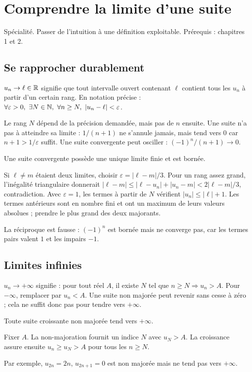 \documentclass[../cours_tle.tex]{subfiles}
\begin{document}
\setcounter{chapter}{8}
\chapter{Comprendre la limite d’une suite}
\label{ch:9}
\begin{objectif}
Spécialité. Passer de l'intuition à une définition exploitable. Prérequis : chapitres 1 et 2.
\end{objectif}
\section{Se rapprocher durablement}
\begin{definition}
$u_n\to\ell\in\mathbb{R}$ signifie que tout intervalle ouvert contenant $\ell$ contient tous les $u_n$ à partir d'un certain rang. En notation précise :
$\forall\varepsilon>0,\ \exists N\in\mathbb{N},\ \forall n\ge N,\ |u_n-\ell|<\varepsilon$.
\end{definition}
Le rang $N$ dépend de la précision demandée, mais pas de $n$ ensuite. Une suite n'a pas à atteindre sa limite : $1/(n+1)$ ne s'annule jamais, mais tend vers $0$ car $n+1>1/\varepsilon$ suffit.
Une suite convergente peut osciller : $(-1)^n/(n+1)\to0$.
\begin{theoreme}
Une suite convergente possède une unique limite finie et est bornée.
\end{theoreme}
\begin{demonstration}
Si $\ell\ne m$ étaient deux limites, choisir $\varepsilon=|\ell-m|/3$. Pour un rang assez grand, l'inégalité triangulaire donnerait $|\ell-m|\le|\ell-u_n|+|u_n-m|<2|\ell-m|/3$, contradiction.
Avec $\varepsilon=1$, les termes à partir de $N$ vérifient $|u_n|\le|\ell|+1$. Les termes antérieurs sont en nombre fini et ont un maximum de leurs valeurs absolues ; prendre le plus grand des deux majorants.
\end{demonstration}
La réciproque est fausse : $(-1)^n$ est bornée mais ne converge pas, car les termes pairs valent $1$ et les impairs $-1$.
\section{Limites infinies}
$u_n\to+\infty$ signifie : pour tout réel $A$, il existe $N$ tel que $n\ge N\Rightarrow u_n>A$. Pour $-\infty$, remplacer par $u_n<A$.
Une suite non majorée peut revenir sans cesse à zéro ; cela ne suffit donc pas pour tendre vers $+\infty$.
\begin{theoreme}
Toute suite croissante non majorée tend vers $+\infty$.
\end{theoreme}
\begin{demonstration}
Fixer $A$. La non-majoration fournit un indice $N$ avec $u_N>A$. La croissance assure ensuite $u_n\ge u_N>A$ pour tous les $n\ge N$.
\end{demonstration}
Par exemple, $u_{2n}=2n$, $u_{2n+1}=0$ est non majorée mais ne tend pas vers $+\infty$.
\end{document}
